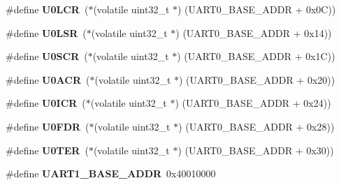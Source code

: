 \begin{DoxyCompactItemize}
\mbox{\label{group__lpc24xx__regs_gac04af46e5aa3dc369e089dac159536d6}} 
\#define {\bfseries U0\+L\+CR}~($\ast$(volatile uint32\+\_\+t $\ast$) (U\+A\+R\+T0\+\_\+\+B\+A\+S\+E\+\_\+\+A\+D\+DR + 0x0\+C))
\item 
\mbox{\label{group__lpc24xx__regs_ga0c5b9c7227b17edfd6ed7a178bf2156d}} 
\#define {\bfseries U0\+L\+SR}~($\ast$(volatile uint32\+\_\+t $\ast$) (U\+A\+R\+T0\+\_\+\+B\+A\+S\+E\+\_\+\+A\+D\+DR + 0x14))
\item 
\mbox{\label{group__lpc24xx__regs_ga7e11c4fdfcb713228362394ecdb4e79a}} 
\#define {\bfseries U0\+S\+CR}~($\ast$(volatile uint32\+\_\+t $\ast$) (U\+A\+R\+T0\+\_\+\+B\+A\+S\+E\+\_\+\+A\+D\+DR + 0x1\+C))
\item 
\mbox{\label{group__lpc24xx__regs_ga0cca0e8af5562309318d79b9363d9296}} 
\#define {\bfseries U0\+A\+CR}~($\ast$(volatile uint32\+\_\+t $\ast$) (U\+A\+R\+T0\+\_\+\+B\+A\+S\+E\+\_\+\+A\+D\+DR + 0x20))
\item 
\mbox{\label{group__lpc24xx__regs_ga465b8a4df1d3de05461b6914359c2884}} 
\#define {\bfseries U0\+I\+CR}~($\ast$(volatile uint32\+\_\+t $\ast$) (U\+A\+R\+T0\+\_\+\+B\+A\+S\+E\+\_\+\+A\+D\+DR + 0x24))
\item 
\mbox{\label{group__lpc24xx__regs_ga8e39253af4ebfaf05755c939464c6f5c}} 
\#define {\bfseries U0\+F\+DR}~($\ast$(volatile uint32\+\_\+t $\ast$) (U\+A\+R\+T0\+\_\+\+B\+A\+S\+E\+\_\+\+A\+D\+DR + 0x28))
\item 
\mbox{\label{group__lpc24xx__regs_gaacbe1c1acc2a2dbfdee9d6979c245cdb}} 
\#define {\bfseries U0\+T\+ER}~($\ast$(volatile uint32\+\_\+t $\ast$) (U\+A\+R\+T0\+\_\+\+B\+A\+S\+E\+\_\+\+A\+D\+DR + 0x30))
\item 
\mbox{\label{group__lpc24xx__regs_ga529a3a887b9327d5f47c86cd2d3d5f20}} 
\#define {\bfseries U\+A\+R\+T1\+\_\+\+B\+A\+S\+E\+\_\+\+A\+D\+DR}~0x40010000
\item 
\mbox{\label{group__lpc24xx__regs_ga29687c0a6ff8551214281273c15171ca}} 

\end{DoxyCompactItemize}
